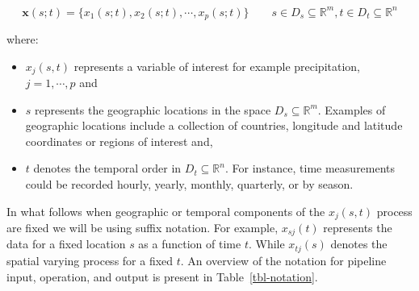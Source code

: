 \documentclass[
]{interact}
\begin{document}
\begin{equation}
\mathbf{x}(s;t) = \{x_1(s;t), x_2(s;t), \cdots, x_p(s;t)\} \qquad s \in D_s \subseteq \mathbb{R}^m, t \in D_t \subseteq \mathbb{R}^n 
\end{equation}

where:

\begin{itemize}
\item
  \(x_j(s, t)\) represents a variable of interest for example
  precipitation, \(j = 1, \cdots, p\) and
\item
  \(s\) represents the geographic locations in the space
  \(D_s \subseteq \mathbb{R}^m\). Examples of geographic locations
  include a collection of countries, longitude and latitude coordinates
  or regions of interest and,
\item
  \(t\) denotes the temporal order in \(D_t \subseteq \mathbb{R}^n\).
  For instance, time measurements could be recorded hourly, yearly,
  monthly, quarterly, or by season.
\end{itemize}

In what follows when geographic or temporal components of the
\(x_j(s,t)\) process are fixed we will be using suffix notation. For
example, \(x_{sj}(t)\) represents the data for a fixed location \(s\) as
a function of time \(t\). While \(x_{tj}(s)\) denotes the spatial
varying process for a fixed \(t\). An overview of the notation for
pipeline input, operation, and output is present in
Table~\ref{tbl-notation}.
\end{document}
